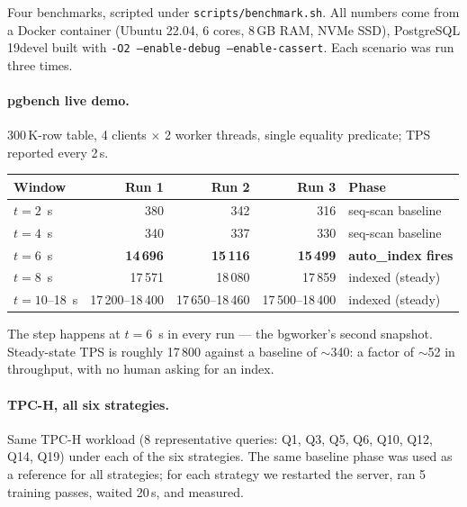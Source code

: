 \documentclass[10pt,a4paper]{article}
\newcommand{\code}[1]{\texttt{\small #1}}
\begin{document}
Four benchmarks, scripted under \code{scripts/benchmark.sh}. All
numbers come from a Docker container (Ubuntu 22.04, 6 cores, 8\,GB
RAM, NVMe SSD), PostgreSQL 19devel built with \code{-O2
--enable-debug --enable-cassert}. Each scenario was run three times.

\paragraph{pgbench live demo.} 300\,K-row table, 4 clients $\times$
2 worker threads, single equality predicate; TPS reported every
2\,s.

\begin{table}[h]
\centering\small
\begin{tabular}{lrrrl}
\toprule
\textbf{Window} & \textbf{Run 1} & \textbf{Run 2} & \textbf{Run 3} & \textbf{Phase} \\
\midrule
$t=2$~s        & 380     & 342     & 316     & seq-scan baseline \\
$t=4$~s        & 340     & 337     & 330     & seq-scan baseline \\
$t=6$~s        & \textbf{14\,696} & \textbf{15\,116} & \textbf{15\,499} & \textbf{auto\_index fires} \\
$t=8$~s        & 17\,571 & 18\,080 & 17\,859 & indexed (steady) \\
$t=10$--18~s   & 17\,200--18\,400 & 17\,650--18\,460 & 17\,500--18\,400 & indexed (steady) \\
\bottomrule
\end{tabular}
\end{table}

The step happens at $t=6$~s in every run --- the bgworker's second
snapshot. Steady-state TPS is roughly 17\,800 against a baseline of
$\sim$340: a factor of $\sim$52 in throughput, with no human asking
for an index.

\paragraph{TPC-H, all six strategies.} Same TPC-H workload (8
representative queries: Q1, Q3, Q5, Q6, Q10, Q12, Q14, Q19) under
each of the six strategies. The same baseline phase was used as a
reference for all strategies; for each strategy we restarted the
server, ran 5 training passes, waited 20\,s, and measured.
\end{document}
